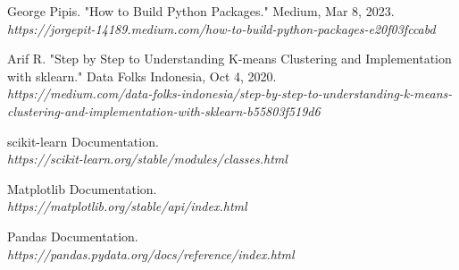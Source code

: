 \documentclass[a4paper, 10pt, conference]{IEEEtran}
\begin{document}
\begin{thebibliography}{5}

George Pipis. "How to Build Python Packages." Medium, Mar 8, 2023. \\ 
\textit{https://jorgepit-14189.medium.com/how-to-build-python-packages-e20f03fccabd}

Arif R. "Step by Step to Understanding K-means Clustering and Implementation with sklearn." Data Folks Indonesia, Oct 4, 2020. \\
\textit{https://medium.com/data-folks-indonesia/step-by-step-to-understanding-k-means-clustering-and-implementation-with-sklearn-b55803f519d6}

scikit-learn Documentation. \\
\textit{https://scikit-learn.org/stable/modules/classes.html}

Matplotlib Documentation. \\
\textit{https://matplotlib.org/stable/api/index.html}

Pandas Documentation. \\
\textit{https://pandas.pydata.org/docs/reference/index.html}

\end{thebibliography}
\end{document}
